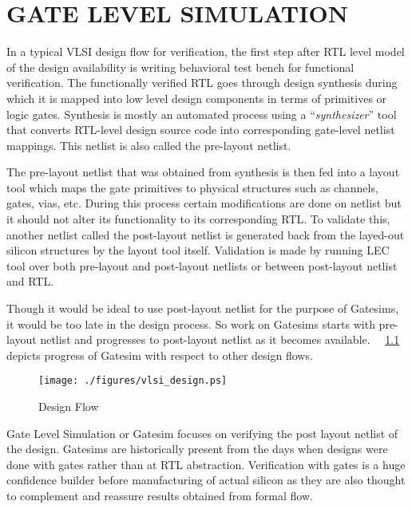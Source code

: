 \chapter{GATE LEVEL SIMULATION}
\label{chap:gate_intro.tex}

In a typical VLSI design flow for verification, the first step after RTL level model of the design availability is writing behavioral test bench for functional verification. The functionally verified RTL goes through design synthesis during which it is mapped into low level design components in terms of primitives or logic gates. Synthesis is mostly an automated process using a ``{\it synthesizer}'' tool that converts RTL-level design source code into corresponding gate-level netlist mappings. This netlist is also called the pre-layout netlist.

The pre-layout netlist that was obtained from synthesis is then fed into a layout tool which maps the gate primitives to physical structures such as channels, gates, vias, etc. During this process certain modifications are done on netlist but it should not alter its functionality to its corresponding RTL. To validate this, another netlist called the post-layout netlist is generated back from the layed-out silicon structures by the layout tool itself. Validation is made by running LEC tool over both pre-layout and post-layout netlists or between post-layout netlist and RTL.

Though it would be ideal to use post-layout netlist for the purpose of Gatesims, it would be too late in the design process. So work on Gatesims starts with pre-layout netlist and progresses to post-layout netlist as it becomes available. ~\figurename{~\ref{fig:vlsi_design.ps}} depicts progress of Gatesim with respect to other design flows.

\begin{figure}[h]
\centering
\texttt{[image: ./figures/vlsi\_design.ps]}
\caption{Design Flow}
\label{fig:vlsi_design.ps}
\end{figure}
Gate Level Simulation or Gatesim focuses on verifying the post layout netlist of the design. Gatesims are historically present from the days when designs were done with gates rather than at RTL abstraction. Verification with gates is a huge confidence builder before manufacturing of actual silicon as they are also thought to complement and reassure results obtained from formal flow.


